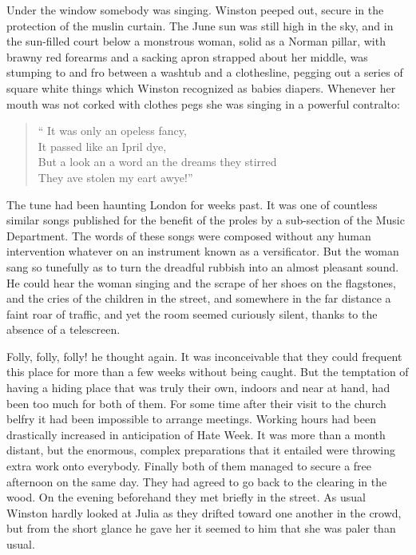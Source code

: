 Under the window somebody was singing. Winston peeped out, secure in the
protection of the muslin curtain. The June sun was still high in the
sky, and in the sun-filled court below a monstrous woman, solid as a
Norman pillar, with brawny red forearms and a sacking apron strapped
about her middle, was stumping to and fro between a washtub and a
clothesline, pegging out a series of square white things which Winston
recognized as babies\textquotesingle{} diapers. Whenever her mouth was
not corked with clothes pegs she was singing in a powerful contralto:

\begin{quotation}
  \noindent`` It was only an \textquotesingle opeless fancy,\\
  It passed like an Ipril dye,\\
  But a look an\textquotesingle{} a word an\textquotesingle{} the
  dreams they stirred\\
  They \textquotesingle ave stolen my \textquotesingle eart awye!''
\end{quotation}

The tune had been haunting London for weeks past. It was one of
countless similar songs published for the benefit of the proles by a
sub-section of the Music Department. The words of these songs were
composed without any human intervention whatever on an instrument known
as a versificator. But the woman sang so tunefully as to turn the
dreadful rubbish into an almost pleasant sound. He could hear the woman
singing and the scrape of her shoes on the flagstones, and the cries of
the children in the street, and somewhere in the far distance a faint
roar of traffic, and yet the room seemed curiously silent, thanks to the
absence of a telescreen.

Folly, folly, folly! he thought again. It was inconceivable that they
could frequent this place for more than a few weeks without being
caught. But the temptation of having a hiding place that was truly their
own, indoors and near at hand, had been too much for both of them. For
some time after their visit to the church belfry it had been impossible
to arrange meetings. Working hours had been drastically increased in
anticipation of Hate Week. It was more than a month distant, but the
enormous, complex preparations that it entailed were throwing extra work
onto everybody. Finally both of them managed to secure a free afternoon
on the same day. They had agreed to go back to the clearing in the wood.
On the evening beforehand they met briefly in the street. As usual
Winston hardly looked at Julia as they drifted toward one another in the
crowd, but from the short glance he gave her it seemed to him that she
was paler than usual.

